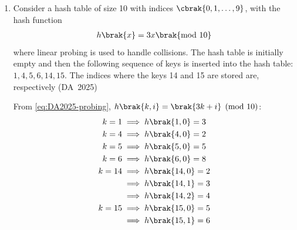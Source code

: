 \begin{enumerate}[label=\thesubsection.\arabic*, ref=\thesubsection.\theenumi]
	\hfill (DA~2025)
	\begin{enumerate}
		\item All owners of a red car, a car made by ABC, or a red car made by ABC
		\item All owners of more than one car, where at least one car is red and made by ABC
		\item All owners of a red car made by ABC
		\item All red cars made by ABC
	\end{enumerate}
	\solution
	From \eqref{eq:DA2025-join}, $\sigma_{\text{color} = \text{'red'}}\brak{\text{Car} \bowtie \brak{\sigma_{\text{maker} = \text{'ABC'}}\text{Make}}}$ filters red cars made by ABC. Joining with $\text{Own}$ and projecting via $\pi_{\text{owner}}$ selects:
	\begin{align}
		\pi_{\text{owner}}\brak{\text{Own} \bowtie \brak{\dots}}
	\end{align}
	which corresponds to all owners of a red car made by ABC.
	
	\item 
	Consider a hash table of size 10 with indices $\cbrak{0, 1, \dots, 9}$, with the hash function
	\begin{align}
		h\brak{x} = 3x \brak{\text{mod } 10}
	\end{align}
	where linear probing is used to handle collisions. The hash table is initially empty and then the following sequence of keys is inserted into the hash table: $1, 4, 5, 6, 14, 15$. The indices where the keys 14 and 15 are stored are, respectively
	\hfill (DA~2025)
	\begin{enumerate}
	\end{enumerate}
	\solution
	From \eqref{eq:DA2025-probing}, $h\brak{k, i} = \brak{3k + i} \pmod{10}$:
	\begin{align}
		k=1 &\implies h\brak{1, 0} = 3
		\\
		k=4 &\implies h\brak{4, 0} = 2
		\\
		k=5 &\implies h\brak{5, 0} = 5
		\\
		k=6 &\implies h\brak{6, 0} = 8
		\\
		k=14 &\implies h\brak{14, 0} = 2
		\\
		&\implies h\brak{14, 1} = 3
		\\
		&\implies h\brak{14, 2} = 4
		\\
		k=15 &\implies h\brak{15, 0} = 5
		\\
		&\implies h\brak{15, 1} = 6
	\end{align}
	

\end{enumerate}
